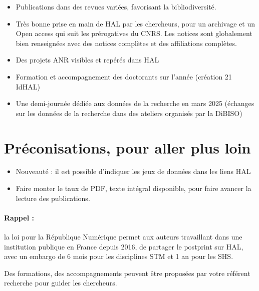 \documentclass[french, 11pt]{../../dibiso/biso}
\begin{document}
\begin{itemize}
  \item Publications dans des revues variées, favorisant la bibliodiversité.
  \item Très bonne prise en main de HAL par les chercheurs, pour un archivage et un Open access qui suit les prérogatives du CNRS. Les notices sont globalement bien renseignées avec des notices complètes et des affiliations complètes.
  \item Des projets ANR visibles et repérés dans HAL
  \item Formation et accompagnement des doctorants sur l’année (création 21 IdHAL)
  \item Une demi-journée dédiée aux données de la recherche en mars 2025 (échanges sur les données de la recherche dans des ateliers organisés par la DiBISO)
\end{itemize}


\section{Préconisations, pour aller plus loin}

\begin{itemize}
  \item Nouveauté : il est possible d’indiquer les jeux de données dans les liens HAL 
  \item Faire monter le taux de PDF, texte intégral disponible, pour faire avancer la lecture des publications.
\end{itemize}

\vfill

\paragraph{Rappel :} la loi pour la République Numérique permet aux auteurs travaillant dans une institution publique en France depuis 2016, de partager le postprint sur HAL, avec un embargo de 6 mois pour les disciplines STM et 1 an pour les SHS.

Des formations, des accompagnements peuvent être proposées par votre référent recherche pour guider les chercheurs. 




\makelastpagereport
 
\end{document}
